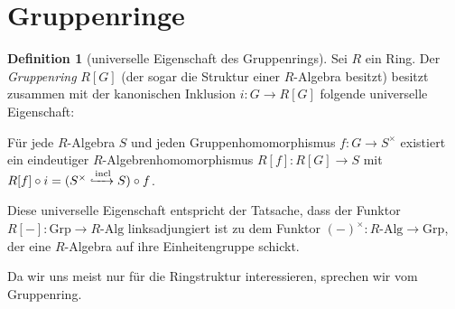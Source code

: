 \documentclass[a4paper,twoside,10pt]{scrreprt}
\theoremstyle{definition}
\newtheorem{definition}[satz]{Definition}
\begin{document}
\section{Gruppenringe}
\begin{definition}[universelle Eigenschaft des Gruppenrings]\label{def:GroupRingUnivProperty}
Sei $R$ ein Ring. Der \emph{Gruppenring} $R[G]$ (der sogar die Struktur einer $R$-Algebra besitzt) besitzt zusammen mit der kanonischen Inklusion $i:G\to R[G]$ folgende universelle Eigenschaft:\par
Für jede $R$-Algebra $S$ und jeden Gruppenhomomorphismus $f:G\to S^{\times}$ existiert ein eindeutiger $R$-Algebrenhomomorphismus $R[f]:R[G]\to S$ mit $R[f]\circ i=(S^{\times} \xhookrightarrow{\text{incl}} S)\circ f$.
\begin{center}
\end{center}
Diese universelle Eigenschaft entspricht der Tatsache, dass der Funktor $R[-]:\text{Grp}\to R\text{-Alg}$ linksadjungiert ist zu dem Funktor $(-)^{\times}:R\text{-Alg}\to \text{Grp}$, der eine $R$-Algebra auf ihre Einheitengruppe schickt.\par
Da wir uns meist nur für die Ringstruktur interessieren, sprechen wir vom Gruppenring.
\end{definition}
\end{document}
